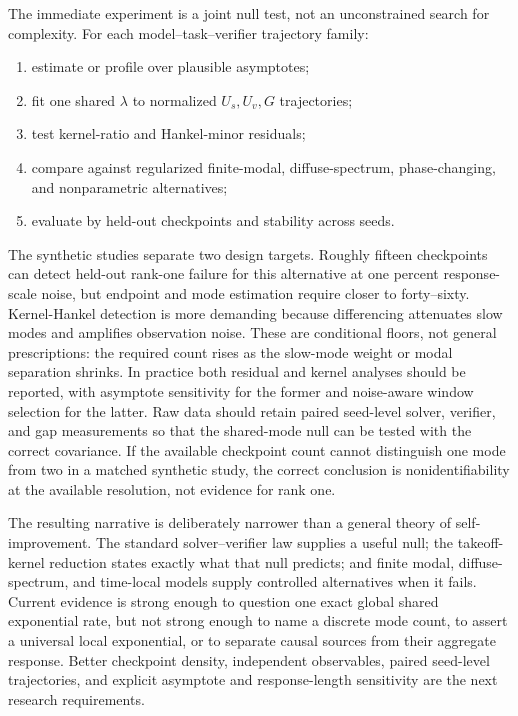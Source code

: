 \documentclass[10pt,twocolumn]{article}
\begin{document}
The immediate experiment is a joint null test, not an unconstrained search for
complexity.  For each model--task--verifier trajectory family:
\begin{enumerate}
 \item estimate or profile over plausible asymptotes;
 \item fit one shared $\lambda$ to normalized $U_s,U_v,G$ trajectories;
 \item test kernel-ratio and Hankel-minor residuals;
 \item compare against regularized finite-modal, diffuse-spectrum, phase-changing,
 and nonparametric alternatives;
 \item evaluate by held-out checkpoints and stability across seeds.
\end{enumerate}
The synthetic studies separate two design targets.  Roughly fifteen
checkpoints can detect held-out rank-one failure for this alternative at one
percent response-scale noise, but endpoint and mode estimation require closer
to forty--sixty.  Kernel-Hankel detection is more demanding because
differencing attenuates slow modes and amplifies observation noise.  These are
conditional floors, not general prescriptions: the required count rises as
the slow-mode weight or modal separation shrinks.  In practice both residual
and kernel analyses should be reported, with asymptote sensitivity for the
former and noise-aware window selection for the latter.  Raw data should retain
paired seed-level solver, verifier, and gap measurements so that the shared-mode
null can be tested with the correct covariance.
If the available checkpoint count cannot distinguish one mode from two in a
matched synthetic study, the correct conclusion is nonidentifiability at the
available resolution, not evidence for rank one.

The resulting narrative is deliberately narrower than a general theory of
self-improvement.  The standard solver--verifier law supplies a useful null;
the takeoff-kernel reduction states exactly what that null predicts; and finite
modal, diffuse-spectrum, and time-local models supply controlled alternatives
when it fails.  Current evidence is strong enough to question one exact global
shared exponential rate, but not strong enough to name a discrete mode count,
to assert a universal local exponential, or to separate causal sources from
their aggregate response.  Better checkpoint density, independent observables,
paired seed-level trajectories, and explicit asymptote and response-length
sensitivity are the next research requirements.
\end{document}
